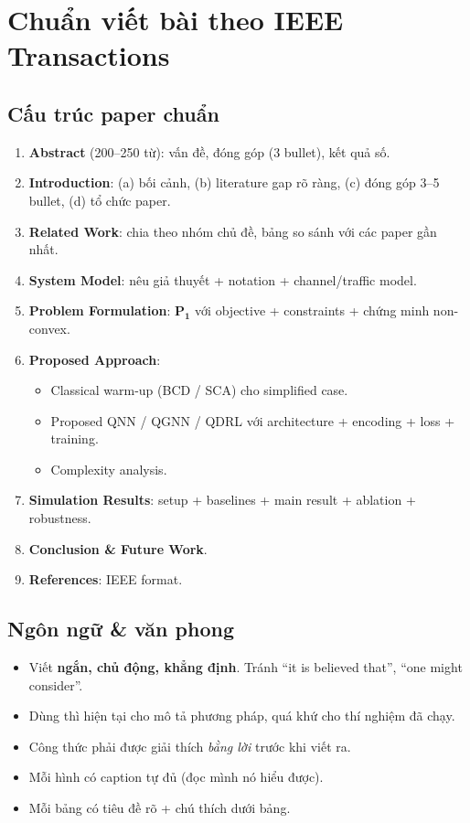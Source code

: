 \documentclass[11pt,a4paper]{article}
\begin{document}
\section{Chuẩn viết bài theo IEEE Transactions}

\subsection{Cấu trúc paper chuẩn}

\begin{enumerate}
  \item \textbf{Abstract} (200--250 từ): vấn đề, đóng góp (3 bullet), kết quả số.
  \item \textbf{Introduction}: (a) bối cảnh, (b) literature gap rõ ràng, (c) đóng góp 3--5 bullet, (d) tổ chức paper.
  \item \textbf{Related Work}: chia theo nhóm chủ đề, bảng so sánh với các paper gần nhất.
  \item \textbf{System Model}: nêu giả thuyết + notation + channel/traffic model.
  \item \textbf{Problem Formulation}: $\mathbf{P_1}$ với objective + constraints + chứng minh non-convex.
  \item \textbf{Proposed Approach}:
    \begin{itemize}
      \item Classical warm-up (BCD / SCA) cho simplified case.
      \item Proposed QNN / QGNN / QDRL với architecture + encoding + loss + training.
      \item Complexity analysis.
    \end{itemize}
  \item \textbf{Simulation Results}: setup + baselines + main result + ablation + robustness.
  \item \textbf{Conclusion \& Future Work}.
  \item \textbf{References}: IEEE format.
\end{enumerate}

\subsection{Ngôn ngữ \& văn phong}

\begin{itemize}
  \item Viết \textbf{ngắn, chủ động, khẳng định}. Tránh ``it is believed that'', ``one might consider''.
  \item Dùng thì hiện tại cho mô tả phương pháp, quá khứ cho thí nghiệm đã chạy.
  \item Công thức phải được giải thích \textit{bằng lời} trước khi viết ra.
  \item Mỗi hình có caption tự đủ (đọc mình nó hiểu được).
  \item Mỗi bảng có tiêu đề rõ + chú thích dưới bảng.
\end{itemize}
\end{document}
